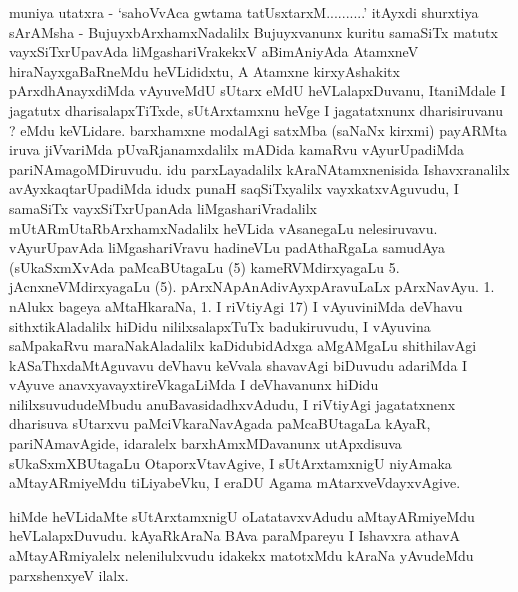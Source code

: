 \begin{artha}
muniya utatxra - `sahoVvAca gwtama tatUsxtarxM..........' itAyxdi shurxtiya sArAMsha - BujuyxbArxhamxNadalilx Bujuyxvanunx kuritu samaSiTx matutx vayxSiTxrUpavAda liMgashariVrakekxV aBimAniyAda AtamxneV hiraNayxgaBaRneMdu heVLididxtu, A Atamxne kirxyAshakitx pArxdhAnayxdiMda vAyuveMdU sUtarx eMdU heVLalapxDuvanu, ItaniMdale I jagatutx dharisalapxTiTxde, sUtArxtamxnu heVge I jagatatxnunx dharisiruvanu ? eMdu keVLidare. barxhamxne modalAgi satxMba (saNaNx kirxmi) payARMta iruva jiVvariMda pUvaRjanamxdalilx mADida kamaRvu vAyurUpadiMda pariNAmagoMDiruvudu. idu parxLayadalilx kAraNAtamxnenisida Ishavxranalilx avAyxkaqtarUpadiMda idudx punaH saqSiTxyalilx vayxkatxvAguvudu, I samaSiTx vayxSiTxrUpanAda liMgashariVradalilx mUtARmUtaRbArxhamxNadalilx heVLida vAsanegaLu nelesiruvavu. vAyurUpavAda liMgashariVravu hadineVLu padAthaRgaLa samudAya (sUkaSxmXvAda paMcaBUtagaLu (5) kameRVMdirxyagaLu 5. jAcnxneVMdirxyagaLu (5). pArxNApAnAdivAyxpAravuLaLx pArxNavAyu. 1. nAlukx bageya aMtaHkaraNa, 1. I riVtiyAgi 17) I vAyuviniMda deVhavu sithxtikAladalilx hiDidu nililxsalapxTuTx badukiruvudu, I vAyuvina saMpakaRvu maraNakAladalilx kaDidubidAdxga aMgAMgaLu shithilavAgi kASaThxdaMtAguvavu deVhavu keVvala shavavAgi biDuvudu adariMda I vAyuve anavxyavayxtireVkagaLiMda I deVhavanunx hiDidu nililxsuvududeMbudu anuBavasidadhxvAdudu, I riVtiyAgi jagatatxnenx dharisuva sUtarxvu paMciVkaraNavAgada paMcaBUtagaLa kAyaR, pariNAmavAgide, idaralelx barxhAmxMDavanunx utApxdisuva sUkaSxmXBUtagaLu OtaporxVtavAgive, I sUtArxtamxnigU niyAmaka aMtayARmiyeMdu tiLiyabeVku, I eraDU Agama mAtarxveVdayxvAgive.
\end{artha}


\begin{artha}
hiMde heVLidaMte sUtArxtamxnigU oLatatavxvAdudu aMtayARmiyeMdu heVLalapxDuvudu. kAyaRkAraNa BAva paraMpareyu I Ishavxra athavA aMtayARmiyalelx nelenilulxvudu idakekx matotxMdu kAraNa yAvudeMdu parxshenxyeV ilalx.
\end{artha}

